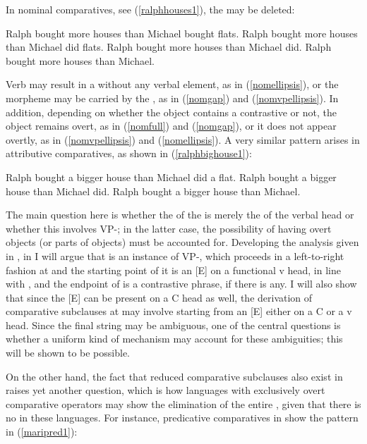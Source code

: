 In nominal comparatives, see (\ref{ralphhouses1}), the  may be deleted:

\ea \label{ralphhouses1}
\ea	Ralph bought more houses than Michael bought flats. \label{nomfull}
\ex	Ralph bought more houses than Michael did flats. \label{nomgap}
\ex	Ralph bought more houses than Michael did. \label{nomvpellipsis}
\ex	Ralph bought more houses than Michael. \label{nomellipsis}
\z
\z

Verb  may result in a  without any verbal element, as in (\ref{nomellipsis}), or the  morpheme may be carried by the , as in (\ref{nomgap}) and (\ref{nomvpellipsis}). In addition, depending on whether the object contains a contrastive  or not, the object  remains overt, as in (\ref{nomfull}) and (\ref{nomgap}), or it does not appear overtly, as in (\ref{nomvpellipsis}) and (\ref{nomellipsis}). A very similar pattern arises in attributive comparatives, as shown in (\ref{ralphbighouse1}):

\ea \label{ralphbighouse1}
\ea	Ralph bought a bigger house than Michael did a flat.
\ex	Ralph bought a bigger house than Michael did.
\ex	Ralph bought a bigger house than Michael.	
\z
\z

The main question here is whether the  of the  is merely the  of the verbal head or whether this involves VP-; in the latter case, the possibility of having overt objects (or parts of objects) must be accounted for. Developing the analysis given in , in  I will argue that  is an instance of VP-, which proceeds in a left-to-right fashion at  and the starting point of it is an [E]  on a functional v head, in line with \citet{merchant2001}, and the endpoint of  is a contrastive phrase, if there is any. I will also show that since the [E]  can be present on a C head as well, the derivation of comparative subclauses at  may involve  starting from an [E]  either on a C or a v head. Since the final string may be ambiguous, one of the central questions is whether a uniform kind of  mechanism may account for these ambiguities; this will be shown to be possible.

On the other hand, the fact that reduced comparative subclauses also exist in  raises yet another question, which is how languages with exclusively overt comparative operators may show the elimination of the entire , given that there is no  in these languages. For instance, predicative comparatives in  show the pattern in (\ref{maripred1}):

